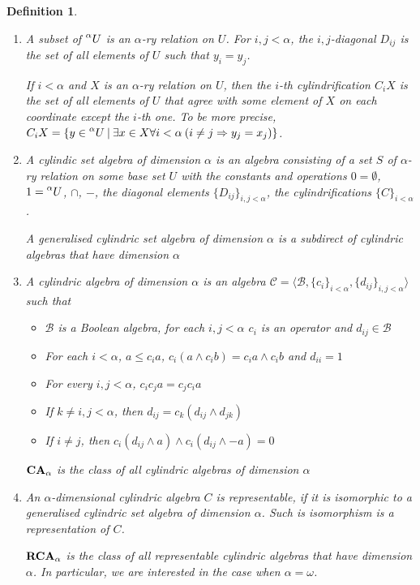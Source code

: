 \documentclass[a4paper]{article}
\theoremstyle{defin}
\newtheorem{defin}{Definition}
\theoremstyle{theorem}
\theoremstyle{prop}
\theoremstyle{lemma}
\theoremstyle{fact}
\theoremstyle{ex}
\theoremstyle{col}
\begin{document}
\begin{defin}
$ $

  \begin{enumerate}
    \item A subset of $\prescript{\alpha}{}U$ is an $\alpha$-ry relation on $U$. For $i, j < \alpha$, the $i,j$-diagonal $D_{ij}$ is the set of all
    elements of $U$ such that $y_i = y_j$.

    If $i < \alpha$ and $X$ is an $\alpha$-ry relation on $U$, then
    the $i$-th cylindrification $C_i X$ is the set of all elements of $U$ that agree with some element of $X$ on each coordinate except the
    $i$-th one. To be more precise,
    $C_i X = \{ y \in \prescript{\alpha}{}U \: | \: \exists x \in X \forall i < \alpha \: (i \neq j \Rightarrow y_j = x_j)\}$.
    \item A cylindic set algebra of dimension $\alpha$ is an algebra consisting of a set $S$ of $\alpha$-ry relation on some base set $U$
    with the constants and operations $0 = \emptyset$, $1 = \prescript{\alpha}{}U$, $\cap$, $-$, the diagonal elements $\{ D_{ij} \}_{i, j < \alpha}$,
    the cylindrifications $\{ C \}_{i < \alpha}$.

    A generalised cylindric set algebra of dimension $\alpha$ is a subdirect of
    cylindric algebras that have dimension $\alpha$
    \item A cylindric algebra of dimension $\alpha$ is an algebra $\mathcal{C} = \langle \mathcal{B}, \{ c_i \}_{i < \alpha}, \{ d_{ij} \}_{i, j < \alpha} \rangle$ such that
    \begin{itemize}
      \item $\mathcal{B}$ is a Boolean algebra, for each $i, j < \alpha$ $c_i$ is an operator and $d_{ij} \in \mathcal{B}$
      \item For each $i < \alpha$, $a \leq c_i a$, $c_i (a \land c_i b) = c_i a \land c_i b$ and $d_{ii} = 1$
      \item For every $i, j < \alpha$, $c_i c_j a = c_j c_i a$
      \item If $k \neq i, j < \alpha$, then $d_{ij} = c_k (d_{ij} \land d_{jk})$
      \item If $i \neq j$, then $c_i (d_{ij} \land a) \land c_i (d_{ij} \land - a) = 0$
    \end{itemize}
    ${\bf CA}_{\alpha}$ is the class of all cylindric algebras of dimension $\alpha$
    \item An $\alpha$-dimensional cylindric algebra $C$ is representable, if it is isomorphic to a generalised cylindric set algebra
    of dimension $\alpha$. Such is isomorphism is a representation of $C$.

    ${\bf RCA}_{\alpha}$ is the class of all representable cylindric algebras that have dimension $\alpha$. In particular, we are interested in the case when $\alpha = \omega$.
  \end{enumerate}
\end{defin}
\end{document}
